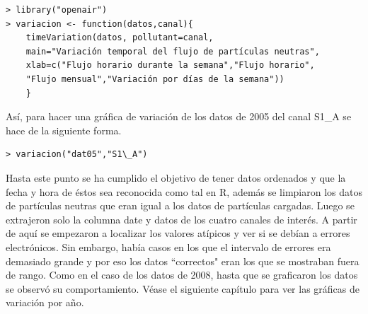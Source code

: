 \begin{mybox}
\begin{verbatim}
> library("openair")
> variacion <- function(datos,canal){
	timeVariation(datos, pollutant=canal,
	main="Variación temporal del flujo de partículas neutras",
	xlab=c("Flujo horario durante la semana","Flujo horario",
	"Flujo mensual","Variación por días de la semana"))
	}
\end{verbatim}
\end{mybox}

Así, para hacer una gráfica de variación de los datos de 2005 del canal S1\_A se hace de la siguiente forma.
\begin{mybox}
\begin{verbatim}
> variacion("dat05","S1\_A")
\end{verbatim}
\end{mybox}

Hasta este punto se ha cumplido el objetivo de tener datos ordenados y que la fecha y hora de éstos sea  reconocida como tal en R, además se limpiaron los datos de partículas neutras que eran igual a los datos de partículas cargadas. Luego se extrajeron solo la columna date y datos de los cuatro canales de interés.  A partir de aquí se empezaron a localizar los valores atípicos y ver si se debían a errores electrónicos. Sin embargo, había casos en los que el intervalo de errores era demasiado grande y por eso los datos ``correctos" eran los que se mostraban fuera de rango. Como en el caso de los datos de 2008, hasta que se graficaron los datos se observó su comportamiento. Véase el siguiente capítulo para ver las gráficas de variación por año. 




